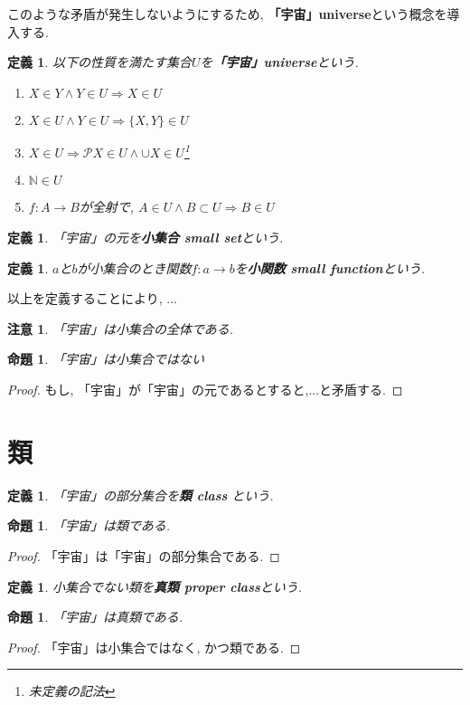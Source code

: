 \documentclass[dvipdfmx]{jsbook}
\theoremstyle{plain}
\newtheorem{Def}[thm]{定義}
\newtheorem{Prop}[thm]{命題}
\newtheorem{caution}[thm]{注意}
\begin{document}
このような矛盾が発生しないようにするため, {\bf 「宇宙」universe}という概念を導入する.
\begin{Def}
以下の性質を満たす集合$U$を{\bf 「宇宙」universe}という.
\begin{enumerate}
\item $X\in Y\land Y\in U\Rightarrow X\in U$
\item $X\in U\land Y\in U\Rightarrow\{X,Y\}\in U$
\item $X\in U\Rightarrow \mathscr{P}X\in U\land \cup X\in U$\footnote{未定義の記法}
\item $\mathbb{N}\in U$
\item $f:A\rightarrow B$が全射で, $A\in U\land B\subset U\Rightarrow B \in U$
\end{enumerate}
\end{Def}
\begin{Def}
「宇宙」の元を{\bf 小集合 small set}という.
\end{Def}
\begin{Def}
$a$と$b$が小集合のとき関数$f:a\rightarrow b$を{\bf 小関数 small function}という.
\end{Def}
以上を定義することにより, ...

\begin{caution}
「宇宙」は小集合の全体である.
\end{caution}
\begin{Prop}
「宇宙」は小集合ではない
\end{Prop}
\begin{proof}
もし, 「宇宙」が「宇宙」の元であるとすると,...と矛盾する.
\end{proof}
\section{類}
\begin{Def}
「宇宙」の部分集合を{\bf 類 class} という.
\end{Def}
\begin{Prop}
「宇宙」は類である.
\end{Prop}
\begin{proof}
「宇宙」は「宇宙」の部分集合である.
\end{proof}
\begin{Def}
小集合でない類を{\bf 真類 proper class}という.
\end{Def}
\begin{Prop}
「宇宙」は真類である.
\end{Prop}
\begin{proof}
「宇宙」は小集合ではなく, かつ類である.
\end{proof}
\end{document}
